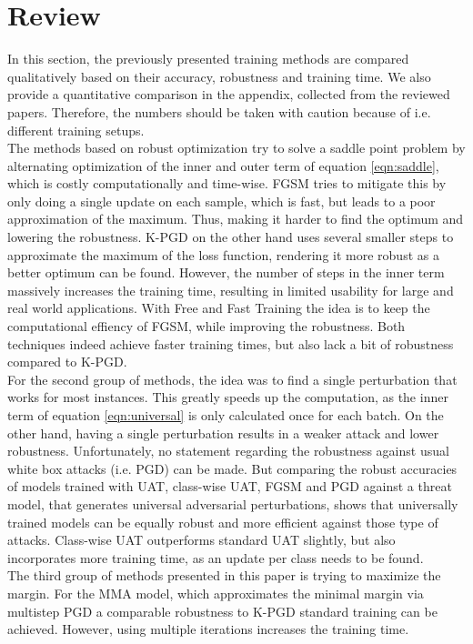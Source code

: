 \documentclass{article}
\begin{document}
\section{Review} \label{rev}
In this section, the previously presented training methods are compared qualitatively based on their accuracy, robustness and training time. We also provide a quantitative comparison in the appendix, collected from the reviewed papers. Therefore, the numbers should be taken with caution because of i.e. different training setups. \\
The methods based on robust optimization try to solve a saddle point problem by alternating optimization of the inner and outer term of equation \ref{eqn:saddle}, which is costly computationally and time-wise. FGSM tries to mitigate this by only doing a single update on each sample, which is fast, but leads to a poor approximation of the maximum. Thus, making it harder to find the optimum and lowering the robustness. K-PGD on the other hand uses several smaller steps to approximate the maximum of the loss function, rendering it more robust as a better optimum can be found. However, the number of steps in the inner term massively increases the training time, resulting in limited usability for large and real world applications. With Free and Fast Training the idea is to keep the computational effiency of FGSM, while improving the robustness. Both techniques indeed achieve faster training times, but also lack a bit of robustness compared to K-PGD. \\
For the second group of methods, the idea was to find a single perturbation that works for most instances. This greatly speeds up the computation, as the inner term of equation \ref{eqn:universal} is only calculated once for each batch. On the other hand, having a single perturbation results in a weaker attack and lower robustness. Unfortunately, no statement regarding the robustness against usual white box attacks (i.e. PGD) can be made. But comparing the robust accuracies of models trained with UAT, class-wise UAT, FGSM and PGD against a threat model, that generates universal adversarial perturbations, shows that universally trained models can be equally robust and more efficient against those type of attacks. Class-wise UAT outperforms standard UAT slightly, but also incorporates more training time, as an update per class needs to be found. \\
The third group of methods presented in this paper is trying to maximize the margin. For the MMA model, which approximates the minimal margin via multistep PGD a comparable robustness to K-PGD standard training can be achieved. However, using multiple iterations increases the training time.
  
\end{document}

